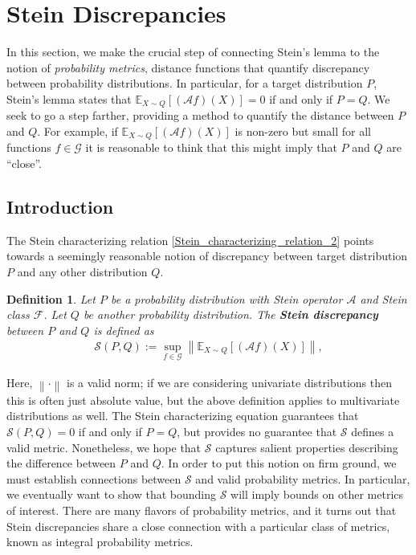 \documentclass[12pt]{article}
\newcommand*{\norm}[1]{\left\lVert#1\right\rVert}
\newcommand{\E}{\mathbb{E}}
\newcommand{\functionSpace}{\mathcal{F}} %
\newcommand{\steinClass}{\mathcal{G}}
\newcommand{\steinOperator}{\mathcal{A}}
\newcommand{\dist}{P}
\newcommand{\distApprox}{Q}
\newcommand{\steinDisc}{\mathcal{S}}
\newtheorem{definition}{Definition}
\begin{document}
 
\section{Stein Discrepancies}
In this section, we make the crucial step of connecting Stein's lemma to the notion of \textit{probability metrics}, distance functions that quantify discrepancy between 
probability distributions. In particular, for a target distribution $\dist$, Stein's lemma states that $\E_{X \sim \distApprox} \left[(\steinOperator f)(X) \right] = 0$ if and only if 
$\dist = \distApprox$. We seek to go a step farther, providing a method to quantify the distance between $\dist$ and $\distApprox$. For example, if 
$\E_{X \sim \distApprox} \left[(\steinOperator f)(X) \right]$ is non-zero but small for all functions $f \in \steinClass$ it is reasonable to think that this might imply that 
$\dist$ and $\distApprox$ are ``close''. 

\subsection{Introduction}
The Stein characterizing relation \ref{Stein_characterizing_relation_2} points towards a seemingly reasonable notion of discrepancy between target distribution $\dist$ and 
any other distribution $\distApprox$. 

\begin{definition}
Let $\dist$ be a probability distribution with Stein operator $\steinOperator$ and Stein class $\functionSpace$. Let $\distApprox$ be another probability distribution. 
The \textbf{Stein discrepancy} between $\dist$ and $\distApprox$ is defined as 
\begin{align}
\steinDisc(\dist, \distApprox) := \sup_{f \in \steinClass} \norm{\E_{X \sim \distApprox} \left[(\steinOperator f)(X) \right]},
\end{align}
\end{definition}
Here, $\norm{\cdot}$ is a valid norm; if we are considering univariate distributions then this is often just absolute value, but the above definition applies to multivariate distributions 
as well. 
The Stein characterizing equation guarantees that $\steinDisc(\dist, \distApprox) = 0$ if and only if $\dist = \distApprox$, but provides no guarantee that $\steinDisc$ defines a valid 
metric. Nonetheless, we hope that $\steinDisc$ captures salient properties describing the difference between $\dist$ and $\distApprox$. In order to put this notion on firm ground, we 
must establish connections between $\steinDisc$ and valid probability metrics. In particular, we eventually want to show that bounding $\steinDisc$ will imply bounds on other metrics of 
interest. There are many flavors of probability metrics, and it turns out that Stein discrepancies share a close connection with a particular class of metrics, known as integral probability 
metrics. 
\end{document}
